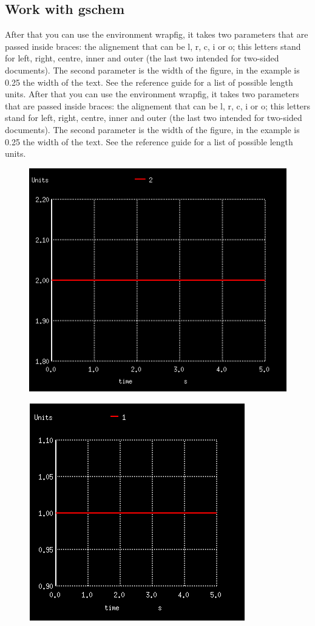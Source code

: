 \documentclass{report}
\begin{document}
		\subsection{Work with gschem}
		After that you can use the environment wrapfig, it takes two parameters that are passed inside braces: the alignement that can be l, r, c, i or o; this letters stand for left, right, centre, inner and outer (the last two intended for two-sided documents). The second parameter is the width of the figure, in the example is 0.25 the width of the text. See the reference guide for a list of possible length units.
		After that you can use the environment wrapfig, it takes two parameters that are passed inside braces: the alignement that can be l, r, c, i or o; this letters stand for left, right, centre, inner and outer (the last two intended for two-sided documents). The second parameter is the width of the figure, in the example is 0.25 the width of the text. See the reference guide for a list of possible length units.
		
		
		\begin{figure}[b]
			\centering
			\begin{minipage}{.5\textwidth}
				\centering
				\includegraphics[width=.4\linewidth]{Figures/oneFig.png}
				\label{fig:test8}
			\end{minipage}%
			\begin{minipage}{.5\textwidth}
				\centering
				\includegraphics[width=.4\linewidth]{Figures/twoFig.png}
				\label{fig:test7}
			\end{minipage}
		\end{figure}
		
\end{document}
